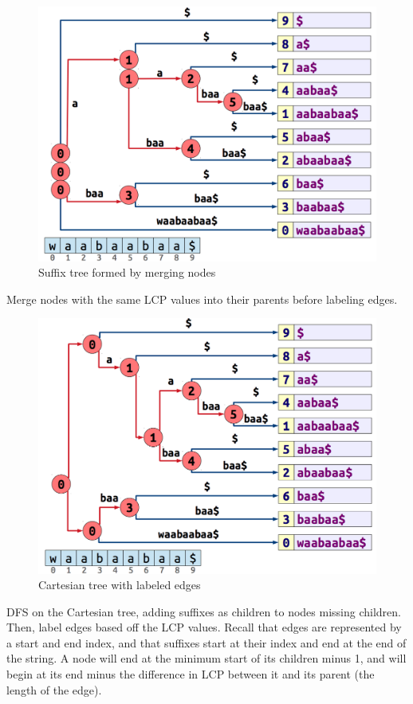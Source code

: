 \documentclass[11pt, oneside]{article}
\begin{document}
\begin{figure}[h!]
\centering
\includegraphics[scale=0.25]{final}
\caption{Suffix tree formed by merging nodes}
\end{figure}

Merge nodes with the same LCP values into their parents before labeling edges.

\begin{figure}[h!]
\centering
\includegraphics[scale=0.25]{edge}
\caption{Cartesian tree with labeled edges}
\end{figure}

DFS on the Cartesian tree, adding suffixes as children to nodes missing children.
Then, label edges based off the LCP values.
Recall that edges are represented by a start and end index, and that
suffixes start at their index and end at the end of the string.
A node will end at the minimum start of its children minus 1,
and will begin at its end minus the difference in LCP between it and its parent
(the length of the edge).
\end{document}
